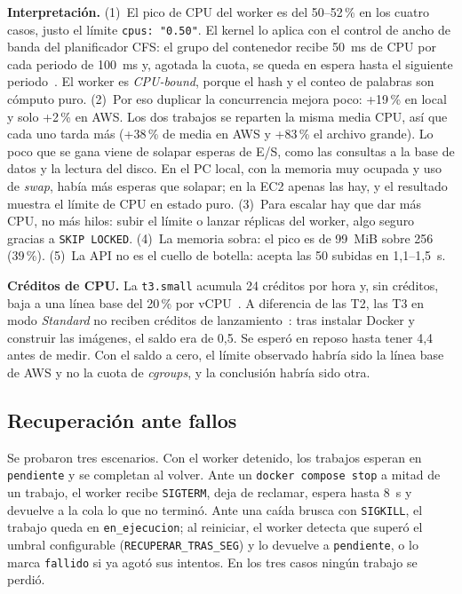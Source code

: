 \documentclass[conference,a4paper]{IEEEtran}
\newcommand{\cod}[1]{\texttt{#1}}
\begin{document}
\textbf{Interpretación.} (1)~El pico de CPU del worker es del 50--52\,\% en los cuatro casos, justo el límite \cod{cpus: "0.50"}. El kernel lo aplica con el control de ancho de banda del planificador CFS: el grupo del contenedor recibe 50~ms de CPU por cada periodo de 100~ms y, agotada la cuota, se queda en espera hasta el siguiente periodo~\cite{kernel-bwc,compose-deploy}. El worker es \emph{CPU-bound}, porque el hash y el conteo de palabras son cómputo puro. (2)~Por eso duplicar la concurrencia mejora poco: +19\,\% en local y solo +2\,\% en AWS. Los dos trabajos se reparten la misma media CPU, así que cada uno tarda más (+38\,\% de media en AWS y +83\,\% el archivo grande). Lo poco que se gana viene de solapar esperas de E/S, como las consultas a la base de datos y la lectura del disco. En el PC local, con la memoria muy ocupada y uso de \textit{swap}, había más esperas que solapar; en la EC2 apenas las hay, y el resultado muestra el límite de CPU en estado puro. (3)~Para escalar hay que dar más CPU, no más hilos: subir el límite o lanzar réplicas del worker, algo seguro gracias a \cod{SKIP LOCKED}. (4)~La memoria sobra: el pico es de 99~MiB sobre 256 (39\,\%). (5)~La API no es el cuello de botella: acepta las 50 subidas en 1,1--1,5~s.

\textbf{Créditos de CPU.} La \cod{t3.small} acumula 24 créditos por hora y, sin créditos, baja a una línea base del 20\,\% por vCPU~\cite{aws-burst}. A diferencia de las T2, las T3 en modo \textit{Standard} no reciben créditos de lanzamiento~\cite{aws-std}: tras instalar Docker y construir las imágenes, el saldo era de 0,5. Se esperó en reposo hasta tener 4,4 antes de medir. Con el saldo a cero, el límite observado habría sido la línea base de AWS y no la cuota de \textit{cgroups}, y la conclusión habría sido otra.

\subsection{Recuperación ante fallos}
Se probaron tres escenarios. Con el worker detenido, los trabajos esperan en \cod{pendiente} y se completan al volver. Ante un \cod{docker compose stop} a mitad de un trabajo, el worker recibe \cod{SIGTERM}, deja de reclamar, espera hasta 8~s y devuelve a la cola lo que no terminó. Ante una caída brusca con \cod{SIGKILL}, el trabajo queda en \cod{en\_ejecucion}; al reiniciar, el worker detecta que superó el umbral configurable (\cod{RECUPERAR\_TRAS\_SEG}) y lo devuelve a \cod{pendiente}, o lo marca \cod{fallido} si ya agotó sus intentos. En los tres casos ningún trabajo se perdió.
\end{document}
